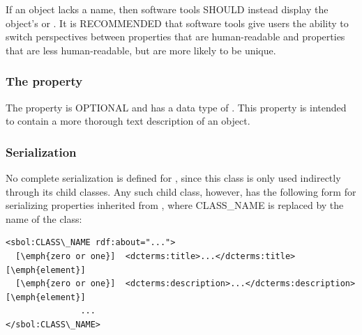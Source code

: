 If an  object lacks a name, then software tools SHOULD instead display the object's  or .
It is RECOMMENDED that software tools give users the ability to switch perspectives between  properties that are human-readable and  properties that are less human-readable, but are more likely to be unique.

\subsubsection*{The  property}
\label{sec:description}

The  property is OPTIONAL and has a data type of . This property is intended to contain a more thorough text description of an  object.

\subsubsection*{Serialization}

No complete serialization is defined for , since this
class is only used indirectly through its child classes.  Any such
child class, however, has the following form for serializing
properties inherited from , where CLASS\_NAME is
replaced by the name of the class:

\begin{lstlisting}
<sbol:CLASS\_NAME rdf:about="...">
  [\emph{zero or one}]  <dcterms:title>...</dcterms:title> [\emph{element}]
  [\emph{zero or one}]  <dcterms:description>...</dcterms:description> [\emph{element}]
               ...
</sbol:CLASS\_NAME>
\end{lstlisting}





